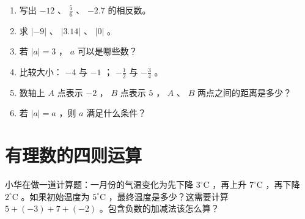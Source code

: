 \begin{practice}


\begin{enumerate}
  \item 写出 $-12$ 、 $\frac{5}{6}$ 、 $-2.7$ 的相反数。
  \item 求 $\lvert -9 \rvert$ 、 $\lvert 3.14 \rvert$ 、 $\lvert 0 \rvert$ 。
  \item 若 $\lvert a \rvert = 3$ ， $a$ 可以是哪些数？
  \item 比较大小： $-4$ 与 $-1$ ； $-\frac{1}{2}$ 与 $-\frac{3}{4}$ 。
  \item 数轴上 $A$ 点表示 $-2$ ， $B$ 点表示 $5$ ， $A$ 、 $B$ 两点之间的距离是多少？
  \item 若 $\lvert a \rvert = a$ ，则 $a$ 满足什么条件？
\end{enumerate}


\end{practice}

\section*{有理数的四则运算}


\begin{explore}


小华在做一道计算题：一月份的气温变化为先下降 $3^\circ\text{C}$ ，再上升 $7^\circ\text{C}$ ，再下降 $2^\circ\text{C}$ 。如果初始温度为 $5^\circ\text{C}$ ，最终温度是多少？这需要计算 $5 + (-3) + 7 + (-2)$ 。包含负数的加减法该怎么算？

\end{explore}

